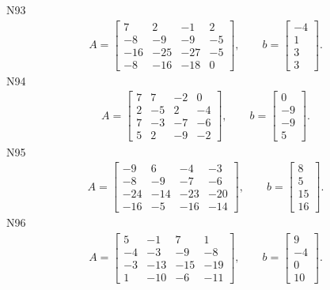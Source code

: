 \documentclass[11pt]{report}
\begin{document}
N93
\begin{align*}
 A = \left[\begin{matrix}7 & 2 & -1 & 2\\-8 & -9 & -9 & -5\\-16 & -25 & -27 & -5\\-8 & -16 & -18 & 0\end{matrix}\right],
\qquad b = \left[\begin{matrix}-4\\1\\3\\3\end{matrix}\right]. 
 \end{align*}
N94
\begin{align*}
 A = \left[\begin{matrix}7 & 7 & -2 & 0\\2 & -5 & 2 & -4\\7 & -3 & -7 & -6\\5 & 2 & -9 & -2\end{matrix}\right],
\qquad b = \left[\begin{matrix}0\\-9\\-9\\5\end{matrix}\right]. 
 \end{align*}
N95
\begin{align*}
 A = \left[\begin{matrix}-9 & 6 & -4 & -3\\-8 & -9 & -7 & -6\\-24 & -14 & -23 & -20\\-16 & -5 & -16 & -14\end{matrix}\right],
\qquad b = \left[\begin{matrix}8\\5\\15\\16\end{matrix}\right]. 
 \end{align*}
N96
\begin{align*}
 A = \left[\begin{matrix}5 & -1 & 7 & 1\\-4 & -3 & -9 & -8\\-3 & -13 & -15 & -19\\1 & -10 & -6 & -11\end{matrix}\right],
\qquad b = \left[\begin{matrix}9\\-4\\0\\10\end{matrix}\right]. 
 \end{align*}
\end{document}

